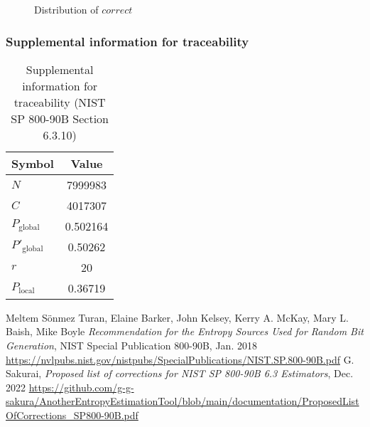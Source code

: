 \documentclass[a3paper,xelatex,english]{bxjsarticle}
\begin{document}
\begin{figure}[htbp]
\centering

\caption{Distribution of $correct$}
\end{figure}
\subsubsection{Supplemental information for traceability}
\renewcommand{\arraystretch}{1.8}
\begin{table}[h]
\caption{Supplemental information for traceability (NIST SP 800-90B Section 6.3.10)}
\begin{center}
\begin{tabular}{|l|c|}
\hline 
\rowcolor{anotherlightblue} %
Symbol				& Value \\ \hline 
$N$				& 7999983\\ \hline 
$C$				& 4017307\\ \hline 
$P_{\textrm{global}}$				& 0.502164\\ \hline 
$P'_{\textrm{global}}$			&  0.50262\\ \hline 
$r$				& 20\\ \hline 
$P_{\textrm{local}}$ 			&  0.36719\\ \hline
\end{tabular}
\end{center}
\end{table}
\renewcommand{\arraystretch}{1.4}
\begin{thebibliography}{99}
Meltem S\"{o}nmez Turan,
Elaine Barker,
John Kelsey,
Kerry A. McKay,
Mary L. Baish,
Mike Boyle
\textit{Recommendation for the Entropy Sources Used for Random Bit Generation},
NIST Special Publication 800-90B, Jan. 2018 
\url{https://nvlpubs.nist.gov/nistpubs/SpecialPublications/NIST.SP.800-90B.pdf}
G. Sakurai, \textit{Proposed list of corrections for NIST SP 800-90B 6.3 Estimators}, Dec. 2022 
\url{https://github.com/g-g-sakura/AnotherEntropyEstimationTool/blob/main/documentation/ProposedListOfCorrections_SP800-90B.pdf}
\end{thebibliography}
\end{document}
